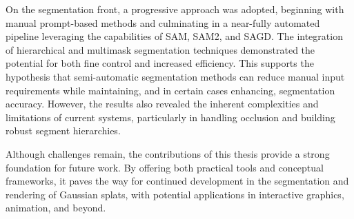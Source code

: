 \documentclass[12pt]{article}
\begin{document}
On the segmentation front, a progressive approach was adopted, beginning with manual prompt-based methods and culminating in a near-fully automated pipeline leveraging the capabilities of SAM, SAM2, and SAGD. The integration of hierarchical and multimask segmentation techniques demonstrated the potential for both fine control and increased efficiency. This supports the hypothesis that semi-automatic segmentation methods can reduce manual input requirements while maintaining, and in certain cases enhancing, segmentation accuracy. However, the results also revealed the inherent complexities and limitations of current systems, particularly in handling occlusion and building robust segment hierarchies.

Although challenges remain, the contributions of this thesis provide a strong foundation for future work. By offering both practical tools and conceptual frameworks, it paves the way for continued development in the segmentation and rendering of Gaussian splats, with potential applications in interactive graphics, animation, and beyond.
\FloatBarrier{}


\end{document}
